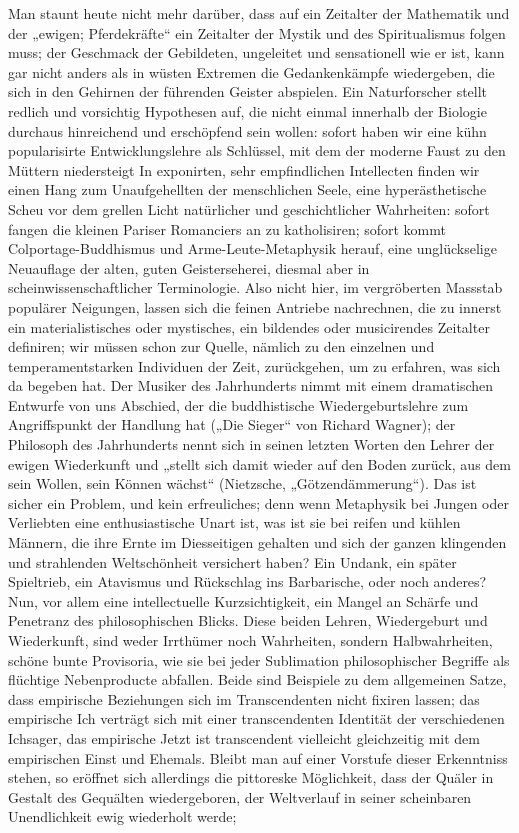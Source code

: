  Man staunt heute nicht mehr darüber, dass auf ein Zeitalter der Mathematik und der „ewigen; Pferdekräfte“ ein Zeitalter der Mystik und des Spiritualismus folgen muss; der Geschmack der Gebildeten, ungeleitet und sensationell wie er ist, kann gar nicht anders als in wüsten Extremen die Gedankenkämpfe wiedergeben, die sich in den Gehirnen der führenden Geister abspielen. Ein Naturforscher stellt redlich und vorsichtig Hypothesen auf, die nicht einmal innerhalb der Biologie durchaus hinreichend und erschöpfend sein wollen: sofort haben wir eine kühn popularisirte Entwicklungslehre als Schlüssel, mit dem der moderne Faust zu den Müttern niedersteigt In exponirten, sehr empfindlichen Intellecten finden wir einen Hang zum Unaufgehellten der menschlichen Seele, eine hyperästhetische Scheu vor dem grellen Licht natürlicher und geschichtlicher Wahrheiten: sofort fangen die kleinen Pariser Romanciers an zu katholisiren; sofort kommt Colportage-Buddhismus und Arme-Leute-Metaphysik herauf, eine unglückselige Neuauflage der alten, guten Geisterseherei, diesmal aber in scheinwissenschaftlicher Terminologie. Also nicht hier, im vergröberten Massstab populärer Neigungen, lassen sich die feinen Antriebe nachrechnen, die zu innerst ein materialistisches oder mystisches, ein bildendes oder musicirendes Zeitalter definiren; wir müssen schon zur Quelle, nämlich zu den einzelnen und temperamentstarken Individuen der Zeit, zurückgehen, um zu erfahren, was sich da begeben hat. Der Musiker des Jahrhunderts nimmt mit einem dramatischen Entwurfe von uns Abschied, der die buddhistische Wiedergeburtslehre zum Angriffspunkt der Handlung hat („Die Sieger“ von Richard Wagner); der Philosoph des Jahrhunderts nennt sich in seinen letzten Worten den Lehrer der ewigen Wiederkunft und „stellt sich damit wieder auf den Boden zurück, aus dem sein Wollen, sein Können wächst“  (Nietzsche, „Götzendämmerung“). Das ist sicher ein Problem, und kein erfreuliches; denn wenn Metaphysik bei Jungen oder Verliebten eine enthusiastische Unart ist, was ist sie bei reifen und kühlen Männern, die ihre Ernte im Diesseitigen gehalten und sich der ganzen klingenden und strahlenden Weltschönheit versichert haben? Ein Undank, ein später Spieltrieb, ein Atavismus und Rückschlag ins Barbarische, oder noch anderes? Nun, vor allem eine intellectuelle Kurzsichtigkeit, ein Mangel an Schärfe und Penetranz des philosophischen Blicks. Diese beiden Lehren, Wiedergeburt und Wiederkunft, sind weder Irrthümer noch Wahrheiten, sondern Halbwahrheiten, schöne bunte Provisoria, wie sie bei jeder Sublimation philosophischer Begriffe als flüchtige Nebenproducte abfallen. Beide sind Beispiele zu dem allgemeinen Satze, dass empirische Beziehungen sich im Transcendenten nicht fixiren lassen; das empirische Ich verträgt sich mit einer transcendenten Identität der verschiedenen Ichsager, das empirische Jetzt ist transcendent vielleicht gleichzeitig mit dem empirischen Einst und Ehemals. Bleibt man auf einer Vorstufe dieser Erkenntniss stehen, so eröffnet sich allerdings die pittoreske Möglichkeit, dass der Quäler in Gestalt des Gequälten wiedergeboren, der Weltverlauf in seiner scheinbaren Unendlichkeit ewig wiederholt werde; 
